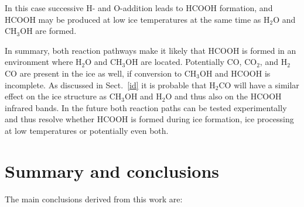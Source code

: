 \documentclass{aa}
\begin{document}
\noindent In this case successive H- and O-addition leads to HCOOH
formation, and HCOOH may be produced at low ice temperatures at the
same time as H$_2$O and CH$_3$OH are formed.

In summary, both reaction pathways make it likely that HCOOH is formed
in an environment where H$_2$O and CH$_3$OH are located. Potentially
CO, CO$_2$, and H$_2$CO are present in the ice as well, if conversion
to CH$_3$OH and HCOOH is incomplete. As discussed in Sect.~\ref{id} it
is probable that H$_2$CO will have a similar effect on the ice
structure as CH$_3$OH and H$_2$O and thus also on the HCOOH infrared
bands. In the future both reaction paths can be tested experimentally
and thus resolve whether HCOOH is formed during ice formation, ice
processing at low temperatures or potentially even both.

\section{Summary and conclusions}
\label{summary}
The main conclusions derived from this work are:
\end{document}

